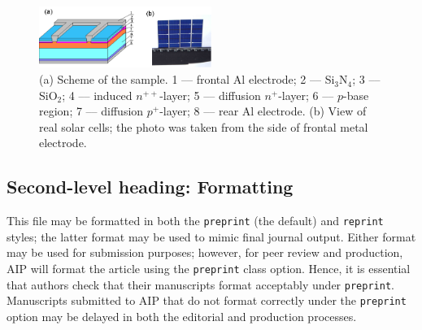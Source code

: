 \documentclass[%
 aip,
 amsmath,amssymb,
 reprint,%
]{revtex4-1}
\begin{document}
\begin{figure}
\includegraphics[width=0.5\textwidth]{Fig1}%
\caption{\label{Fig:sample} 
(a) Scheme of the sample. 
1 –-- frontal Al electrode; 
2 –-- Si$_3$N$_4$; 
3 –-- SiO$_2$; 
4 –-- induced $n^{++}$-layer; 
5 –-- diffusion $n^+$-layer; 
6 –-- $p$-base region; 
7 –-- diffusion $p^+$-layer; 
8 –-- rear Al electrode.
(b) View of real solar cells; 
the photo was taken from the side of frontal metal electrode.
}
\end{figure}

%
%

\subsection{\label{sec:level2}Second-level heading: Formatting}

This file may be formatted in both the \texttt{preprint} (the default) and
\texttt{reprint} styles; the latter format may be used to
mimic final journal output. Either format may be used for submission
purposes; however, for peer review and production, AIP will format the
article using the \texttt{preprint} class option. Hence, it is
essential that authors check that their manuscripts format acceptably
under \texttt{preprint}. Manuscripts submitted to AIP that do not
format correctly under the \texttt{preprint} option may be delayed in
both the editorial and production processes.
\end{document}

